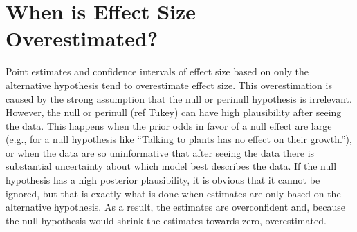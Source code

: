 \documentclass[a4paper]{article}
\newcommand{\DONside}[1]{\todo[color=white]{#1}}
\begin{document}
\section*{When is Effect Size Overestimated?}
Point estimates and confidence intervals of effect size based on only the alternative hypothesis tend to overestimate effect size. This overestimation is caused by the strong assumption that the null or perinull hypothesis is irrelevant. However, the null or perinull (ref Tukey\DONside{ref Tukey}) can have high plausibility after seeing the data. This happens when the prior odds in favor of a null effect are large (e.g., for a null hypothesis like ``Talking to plants has no effect on their growth.''), or when the data are so uninformative that after seeing the data there is substantial uncertainty about which model best describes the data. If the null hypothesis has a high posterior plausibility, it is obvious that it cannot be ignored, but that is exactly what is done when estimates are only based on the alternative hypothesis. As a result, the estimates are overconfident and, because the null hypothesis would shrink the estimates towards zero, overestimated.
\end{document}
